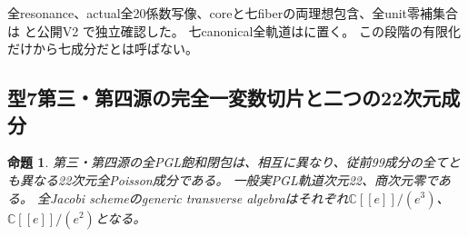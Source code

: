 \documentclass[a4paper,11pt]{ltjsarticle}
\newtheorem{proposition}{命題}[section]
\theoremstyle{definition}
\begin{document}
全resonance、actual全20係数写像、coreと七fiberの両理想包含、全unit零補集合は
と公開V2
で独立確認した。
七canonical全軌道はに置く。
この段階の有限化だけから七成分だとは呼ばない。

\subsection{型7第三・第四源の完全一変数切片と二つの22次元成分}
\begin{proposition}\label{prop:nil22-long-two-components}
第三・第四源の全PGL飽和閉包は、相互に異なり、従前99成分の全てとも異なる22次元全Poisson成分である。
一般実PGL軌道次元22、商次元零である。
全Jacobi schemeのgeneric transverse algebraはそれぞれ$\mathbb C[[e]]/(e^3)$、$\mathbb C[[e]]/(e^2)$となる。
\end{proposition}
\end{document}
